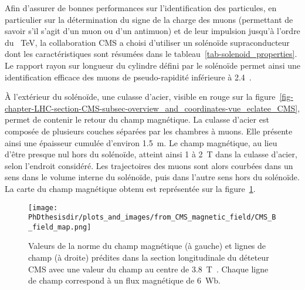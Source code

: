 \par Afin d'assurer de bonnes performances sur l'identification des particules, en particulier sur la détermination du signe de la charge des muons (permettant de savoir s'il s'agit d'un muon ou d'un antimuon) et de leur impulsion jusqu'à l'ordre du \SI{}{\TeV}, la collaboration CMS a choisi d'utiliser un solénoïde supraconducteur~\cite{cms_paper,CERN-LHCC-97-010,CMS_TDR_1,CMS_magnet} dont les caractéristiques sont résumées dans le tableau~\ref{tab-solenoid_properties}.
Le rapport rayon sur longueur du cylindre défini par le solénoïde permet ainsi une identification efficace des muons de pseudo-rapidité inférieure à \num{2.4}~\cite{CERN-LHCC-97-010}.
\par À l'extérieur du solénoïde, une culasse d'acier, visible en rouge sur la figure~\ref{fig-chapter-LHC-section-CMS-subsec-overview_and_coordinates-vue_eclatee_CMS}, permet de contenir le retour du champ magnétique.
La culasse d'acier est composée de plusieurs couches séparées par les chambres à muons.
Elle présente ainsi une épaisseur cumulée d'environ \SI{1.5}{\meter}.
Le champ magnétique, au lieu d'être presque nul hors du solénoïde, atteint ainsi \num{1} à \SI{2}{\tesla} dans la culasse d'acier, selon l'endroit considéré.
Les trajectoires des muons sont alors courbées dans un sens dans le volume interne du solénoïde, puis dans l'autre sens hors du solénoïde.
La carte du champ magnétique obtenu est représentée sur la figure~\ref{fig-chapter-LHC-section-CMS-subsec-solenoide-CMS_B_field_map}.
\begin{figure}[h]
\centering
\texttt{[image: \\PhDthesisdir/plots\_and\_images/from\_CMS\_magnetic\_field/CMS\_B\_field\_map.png]}
\caption[Champ magnétique dans le détecteur CMS.]{Valeurs de la norme du champ magnétique (à gauche) et lignes de champ (à droite) prédites dans la section longitudinale du déteteur CMS avec une valeur du champ au centre de \SI{3.8}{\tesla}~\cite{CMS_magnetic_field}. Chaque ligne de champ correspond à un flux magnétique de \SI{6}{\weber}.}
\label{fig-chapter-LHC-section-CMS-subsec-solenoide-CMS_B_field_map}
\end{figure}